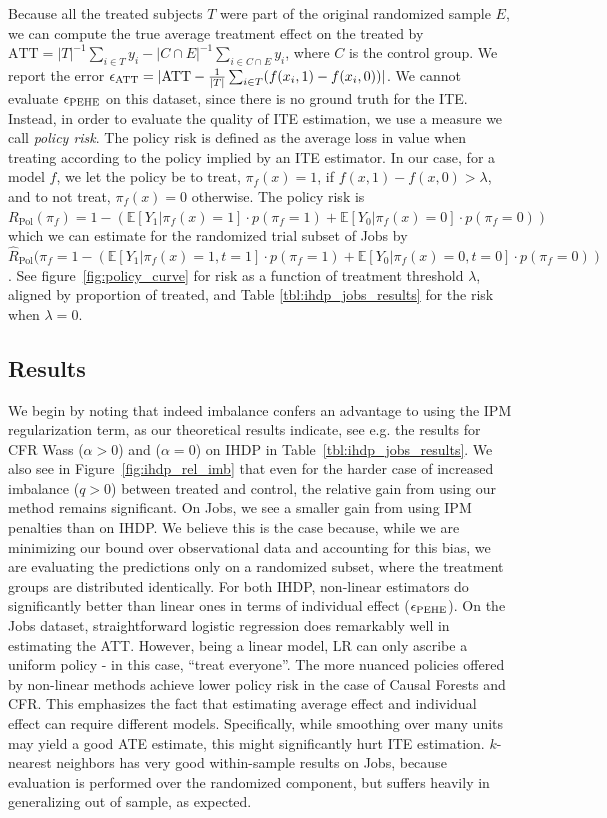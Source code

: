 Because all the treated subjects $T$ were part of the original randomized sample $E$, we can compute the true average treatment effect on the treated by $\text{ATT} = {|T|}^{-1}\sum_{i \in T} y_i - {|C \cap E|}^{-1}\sum_{i \in C \cap E} y_i$, where $C$ is the control group. We report the error $\epsilon_{\text{ATT}} = | \text{ATT} - \frac{1}{|T|}\sum_{i\in T} (f(x_i, 1) - f(x_i, 0))|$.
We cannot evaluate $\epsilon_{\text{PEHE}}$ on this dataset, since there is no ground truth for the ITE. Instead, in order to evaluate the quality of ITE estimation, we use a measure we call \emph{policy risk}. The policy risk is defined as the average loss in value when treating according to the policy implied by an ITE estimator. In our case, for a model $f$, we let the policy be to treat, $\pi_f(x) = 1$, if $f(x,1) - f(x,0) > \lambda$, and to not treat, $\pi_f(x) = 0$ otherwise. The policy risk is $R_{\text{Pol}}(\pi_f) = 1 - (\mathbb{E}[Y_1|\pi_f(x)=1]\cdot p(\pi_f=1) + \mathbb{E}[Y_0|\pi_f(x)=0]\cdot p(\pi_f=0))$ which we can estimate for the randomized trial subset of Jobs by $\hat{R}_{\text{Pol}}(\pi_f = 1 - (\mathbb{E}[Y_1|\pi_f(x)=1, t=1]\cdot p(\pi_f=1) + \mathbb{E}[Y_0|\pi_f(x)=0, t=0]\cdot p(\pi_f=0))$. See figure~\ref{fig:policy_curve} for risk as a function of treatment threshold $\lambda$, aligned by proportion of treated, and Table \ref{tbl:ihdp_jobs_results} for the risk when $\lambda=0$.
\vskip -5pt
\subsection{Results}
We begin by noting that indeed imbalance confers an advantage to using the IPM regularization term, as our theoretical results indicate, see e.g. the results for CFR Wass ($\alpha > 0$) and \tarnet{} ($\alpha = 0$) on IHDP in Table~\ref{tbl:ihdp_jobs_results}. We also see in Figure~\ref{fig:ihdp_rel_imb} that even for the harder case of increased imbalance ($q>0$) between treated and control, the relative gain from using our method remains significant. On Jobs, we see a smaller gain from using IPM penalties than on IHDP. We believe this is the case because, while we are minimizing our bound over observational data and accounting for this bias, we are evaluating the predictions only on a randomized subset, where the treatment groups are distributed identically.
For both IHDP, non-linear estimators do significantly better than linear ones in terms of individual effect ($\epsilon_{\text{PEHE}}$). On the Jobs dataset, straightforward logistic regression does remarkably well in estimating the ATT. However, being a linear model, LR can only ascribe a uniform policy - in this case, ``treat everyone''. The more nuanced policies offered by non-linear methods achieve lower policy risk in the case of Causal Forests and CFR. This emphasizes the fact that estimating average effect and individual effect can require different models. Specifically, while smoothing over many units may yield a good ATE estimate, this might significantly hurt ITE estimation. $k$-nearest neighbors has very good within-sample results on Jobs, because evaluation is performed over the randomized component, but suffers heavily in generalizing out of sample, as expected.




